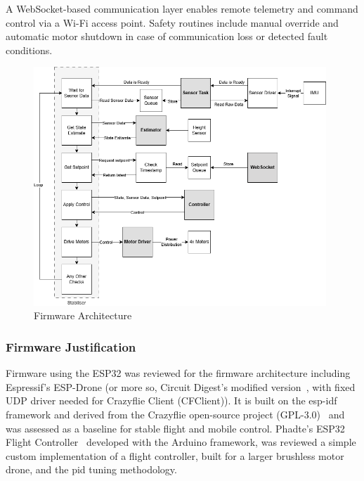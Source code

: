 A WebSocket-based communication layer enables remote telemetry and command control via a Wi-Fi access point. Safety routines include manual override and automatic motor shutdown in case of communication loss or detected fault conditions.

\begin{figure}[H]
    \centering
    \captionsetup{justification=centering, margin=1cm}
    \includegraphics[width=0.98\textwidth]{img/block-software-gray2.PNG}
    \caption{Firmware Architecture}
    \label{fig:block-software}
\end{figure}

\subsubsection{Firmware Justification}

Firmware using the ESP32 was reviewed for the firmware architecture including Espressif’s ESP-Drone (or more so, Circuit Digest’s modified version~\cite{espdrone_circuitdigest}, with fixed UDP driver needed for Crazyflie Client (CFClient)). It is built on the \gls{esp-idf} framework and derived from the Crazyflie open-source project (GPL-3.0)~\cite{bitcraze_crazyflie_firmware} and was assessed as a baseline for stable flight and mobile control. Phadte’s ESP32 Flight Controller~\cite{pratikphadte_flight_controller} developed with the Arduino framework, was reviewed a simple custom implementation of a flight controller, built for a larger brushless motor drone, and the \gls{pid} tuning methodology.  

